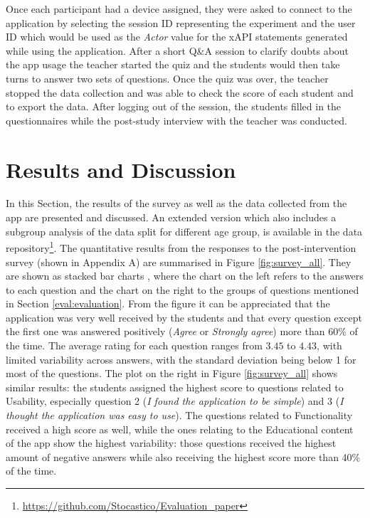 Once each participant had a device assigned, they were asked to connect to the application by selecting the session ID representing the experiment and the user ID which would be used as the \textit{Actor} value for the xAPI statements generated while using the application.
After a short Q\&A session to clarify doubts about the app usage the teacher started the quiz and the students would then take turns to answer two sets of questions.
Once the quiz was over, the teacher stopped the data collection and was able to check the score of each student and to export the data.
After logging out of the session, the students filled in the questionnaires while the post-study interview with the teacher was conducted.


\section{Results and Discussion}\label{eval:results}

In this Section, the results of the survey as well as the data collected from the app are presented and discussed. An extended version which also includes a subgroup analysis of the data split for different age group, is available in the data repository\footnote{\url{https://github.com/Stocastico/Evaluation_paper}}. The quantitative results from the responses to the post-intervention survey (shown in Appendix A) are summarised in Figure \ref{fig:survey_all}. They are shown as stacked bar charts \citep{friedman1999rating}, where the chart on the left  refers to the answers to each question and the chart on the right to the groups of questions mentioned in Section \ref{eval:evaluation}.
From the figure it can be appreciated that the application was very well received by the students and that every question except the first one was answered positively (\textit{Agree} or \textit{Strongly agree}) more than 60\% of the time.
The average rating for each question ranges from $3.45$ to $4.43$, with limited variability across answers, with the standard deviation being below 1 for most of the questions.
The plot on the right in Figure \ref{fig:survey_all} shows similar results: the students assigned the highest score to questions related to Usability, especially question 2 (\textit{I found the application to be simple}) and 3 (\textit{I thought the application was easy to use}). The questions related to Functionality received a high score as well, while the ones relating to the Educational content of the app show the highest variability: those questions received the highest amount of negative answers while also receiving the highest score more than 40\% of the time. 

